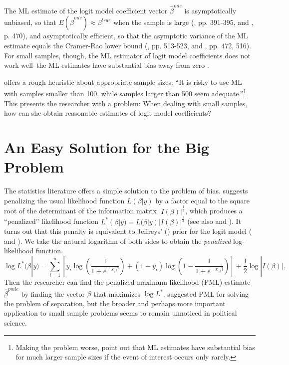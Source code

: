 \documentclass[12pt]{article}
\begin{document}
The ML estimate of the logit model coefficient vector $\hat{\beta}^{mle}$ is asymptotically unbiased, so that $E(\hat{\beta}^{mle}) \approx \beta^{true}$ when the sample is large (\citealt{Wooldridge2002}, pp. 391-395, and \citealt{CasellaBerger2002}, p. 470), and asymptotically efficient, so that the asymptotic variance of the ML estimate equals the Cramer-Rao lower bound (\citealt{Greene2012}, pp. 513-523, and \citealt{CasellaBerger2002}, pp. 472, 516). 
For small samples, though, the ML estimator of logit model coefficients does not work well--the ML estimates have substantial bias away from zero \citep[pp. 53-54]{Long1997}.

\citet[p. 54]{Long1997} offers a rough heuristic about appropriate sample sizes: ``It is risky to use ML with samples smaller than 100, while samples larger than 500 seem adequate.''\footnote{Making the problem worse, \cite{KingZeng2001} point out that ML estimates have substantial bias for much larger sample sizes if the event of interest occurs only rarely.}
This presents the researcher with a problem: When dealing with small samples, how can she obtain reasonable estimates of logit model coefficients?

\section*{An Easy Solution for the Big Problem}

The statistics literature offers a simple solution to the problem of bias.
\cite{Firth1993} suggests penalizing the usual likelihood function $L(\beta | y)$ by a factor equal to the square root of the determinant of the information matrix $|I(\beta)|^\frac{1}{2}$, which produces a ``penalized'' likelihood function $L^*(\beta | y) = L(\beta | y)|I(\beta)|^\frac{1}{2}$ (see also \citealt{KosmidisFirth2009} and \citealt{Kosmidis2014}).
It turns out that this penalty is equivalent to Jeffreys' (\citeyear{Jeffreys1946}) prior for the logit model (\citealt{Firth1993} and \citealt{Poirier1994}).
We take the natural logarithm of both sides to obtain the \textit{penalized} log-likelihood function.
\begin{equation}\nonumber
\log L^*(\beta | y) = \displaystyle \sum_{i = 1}^n \left[y_i \log \left( \dfrac{1}{1 + e^{-X_i\beta}}\right) + (1 - y_i) \log \left(1 - \dfrac{1}{1 + e^{-X_i\beta}}\right)\right] + \dfrac{1}{2} \log |I(\beta)|.
\end{equation}
Then the researcher can find the penalized maximum likelihood (PML) estimate $\hat{\beta}^{pmle}$ by finding the vector $\beta$ that maximizes $\log L^*$.
\cite{Zorn2005} suggested PML for solving the problem of separation,
but the broader and perhaps more important application to small sample problems seems to remain unnoticed in political science.
\end{document}
